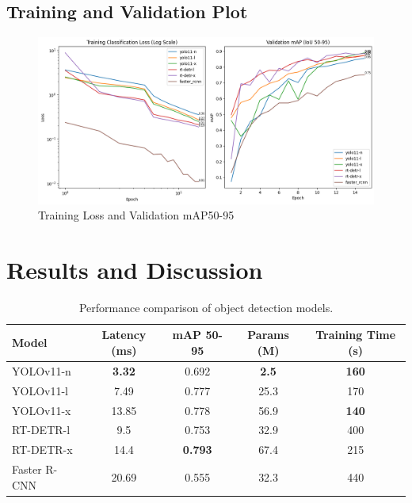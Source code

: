 \documentclass[a4paper]{article}
\begin{document}
\subsection{Training and Validation Plot}
    \begin{figure}[htbp]
        \centering
        \includegraphics[width=1.0\textwidth]{./images/training.png}
        \caption{Training Loss and Validation mAP50-95}
        \label{fig:Images}
    \end{figure}


\newpage
\section{Results and Discussion}
\begin{table}[h!]
    \centering
    \begin{tabular}{|l|c|c|c|c|}
    \hline
    Model & Latency (ms) & mAP 50-95 & Params (M) & Training Time (s) \\
    \hline
    YOLOv11-n & \textbf{3.32} & 0.692 & \textbf{2.5} & \textbf{160} \\
    YOLOv11-l & 7.49 & 0.777 & 25.3 & 170 \\
    YOLOv11-x & 13.85 & 0.778 & 56.9 & \textbf{140} \\
    RT-DETR-l & 9.5 & 0.753 & 32.9 & 400 \\
    RT-DETR-x & 14.4 & \textbf{0.793} & 67.4 & 215 \\
    Faster R-CNN & 20.69 & 0.555 & 32.3 & 440 \\
    \hline
    \end{tabular}
    \caption{Performance comparison of object detection models.}
    \label{tab:performance_metrics}
\end{table}
\end{document}
